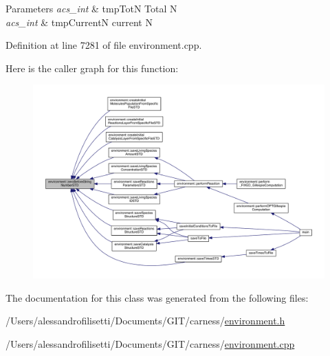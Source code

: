 \begin{DoxyParams}{Parameters}
{\em acs\-\_\-int} & tmp\-Tot\-N Total N \\
\hline
{\em acs\-\_\-int} & tmp\-Current\-N current N \\
\hline
\end{DoxyParams}


Definition at line 7281 of file environment.\-cpp.



Here is the caller graph for this function\-:\nopagebreak
\begin{figure}[H]
\begin{center}
\leavevmode
\includegraphics[width=350pt]{a00014_a8699a0f85f5e8dc23eb8f78fa22c6b17_icgraph}
\end{center}
\end{figure}




The documentation for this class was generated from the following files\-:\begin{DoxyCompactItemize}
\item 
/\-Users/alessandrofilisetti/\-Documents/\-G\-I\-T/carness/\hyperlink{a00086}{environment.\-h}\item 
/\-Users/alessandrofilisetti/\-Documents/\-G\-I\-T/carness/\hyperlink{a00085}{environment.\-cpp}\end{DoxyCompactItemize}
